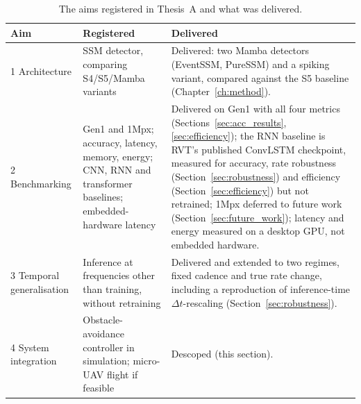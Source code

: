 \documentclass[11pt, a4paper]{report}
\begin{document}
\begin{table}[htbp]
\centering
\small
\caption[Thesis A aims against what was delivered]{The aims registered in Thesis~A and what was delivered.}
\label{tab:aims}
\begin{tabularx}{\textwidth}{@{}l>{\raggedright\arraybackslash}X>{\raggedright\arraybackslash}X@{}}
\toprule
\textbf{Aim} & \textbf{Registered} & \textbf{Delivered} \\
\midrule
1 Architecture & SSM detector, comparing S4/S5/Mamba variants &
  Delivered: two Mamba detectors (EventSSM, PureSSM) and a spiking variant, compared against the S5
  baseline (Chapter~\ref{ch:method}). \\
2 Benchmarking & Gen1 and 1Mpx; accuracy, latency, memory, energy; CNN, RNN and transformer baselines;
  embedded-hardware latency &
  Delivered on Gen1 with all four metrics (Sections~\ref{sec:acc_results}, \ref{sec:efficiency}); the
  RNN baseline is RVT's published ConvLSTM checkpoint, measured for accuracy, rate robustness
  (Section~\ref{sec:robustness}) and efficiency (Section~\ref{sec:efficiency}) but not retrained;
  1Mpx deferred to future work (Section~\ref{sec:future_work}); latency and energy measured on a
  desktop GPU, not embedded hardware. \\
3 Temporal generalisation & Inference at frequencies other than training, without retraining &
  Delivered and extended to two regimes, fixed cadence and true rate change, including a reproduction
  of inference-time $\Delta t$-rescaling (Section~\ref{sec:robustness}). \\
4 System integration & Obstacle-avoidance controller in simulation; micro-UAV flight if feasible &
  Descoped (this section). \\
\bottomrule
\end{tabularx}
\end{table}
\end{document}
